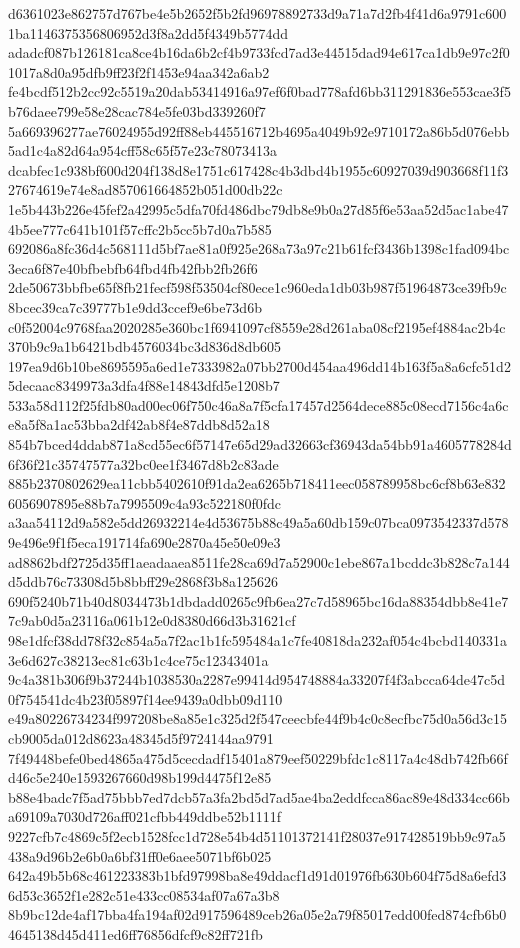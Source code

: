 \documentclass[11pt,a4paper]{article}
\begin{document}
{d6361023e862757d767be4e5b2652f5b2fd96978892733d9a71a7d2fb4f41d6a9791c6001ba1146375356806952d3f8a2dd5f4349b5774dd
adadcf087b126181ca8ce4b16da6b2cf4b9733fcd7ad3e44515dad94e617ca1db9e97c2f01017a8d0a95dfb9ff23f2f1453e94aa342a6ab2
fe4bcdf512b2cc92c5519a20dab53414916a97ef6f0bad778afd6bb311291836e553cae3f5b76daee799e58e28cac784e5fe03bd339260f7
5a669396277ae76024955d92ff88eb445516712b4695a4049b92e9710172a86b5d076ebb5ad1c4a82d64a954cff58c65f57e23c78073413a
dcabfec1c938bf600d204f138d8e1751c617428c4b3dbd4b1955c60927039d903668f11f327674619e74e8ad857061664852b051d00db22c
1e5b443b226e45fef2a42995c5dfa70fd486dbc79db8e9b0a27d85f6e53aa52d5ac1abe474b5ee777c641b101f57cffc2b5cc5b7d0a7b585
692086a8fc36d4c568111d5bf7ae81a0f925e268a73a97c21b61fcf3436b1398c1fad094bc3eca6f87e40bfbebfb64fbd4fb42fbb2fb26f6
2de50673bbfbe65f8fb21fecf598f53504cf80ece1c960eda1db03b987f51964873ce39fb9c8bcec39ca7c39777b1e9dd3ccef9e6be73d6b
c0f52004c9768faa2020285e360bc1f6941097cf8559e28d261aba08cf2195ef4884ac2b4c370b9c9a1b6421bdb4576034bc3d836d8db605
197ea9d6b10be8695595a6ed1e7333982a07bb2700d454aa496dd14b163f5a8a6cfc51d25decaac8349973a3dfa4f88e14843dfd5e1208b7
533a58d112f25fdb80ad00ec06f750c46a8a7f5cfa17457d2564dece885c08ecd7156c4a6ce8a5f8a1ac53bba2df42ab8f4e87ddb8d52a18
854b7bced4ddab871a8cd55ec6f57147e65d29ad32663cf36943da54bb91a4605778284d6f36f21c35747577a32bc0ee1f3467d8b2c83ade
885b2370802629ea11cbb5402610f91da2ea6265b718411eec058789958bc6cf8b63e8326056907895e88b7a7995509c4a93c522180f0fdc
a3aa54112d9a582e5dd26932214e4d53675b88c49a5a60db159c07bca0973542337d5789e496e9f1f5eca191714fa690e2870a45e50e09e3
ad8862bdf2725d35ff1aeadaaea8511fe28ca69d7a52900c1ebe867a1bcddc3b828c7a144d5ddb76c73308d5b8bbff29e2868f3b8a125626
690f5240b71b40d8034473b1dbdadd0265c9fb6ea27c7d58965bc16da88354dbb8e41e77c9ab0d5a23116a061b12e0d8380d66d3b31621cf
98e1dfcf38dd78f32c854a5a7f2ac1b1fc595484a1c7fe40818da232af054c4bcbd140331a3e6d627c38213ec81c63b1c4ce75c12343401a
9c4a381b306f9b37244b1038530a2287e99414d954748884a33207f4f3abcca64de47c5d0f754541dc4b23f05897f14ee9439a0dbb09d110
e49a80226734234f997208be8a85e1c325d2f547ceecbfe44f9b4c0c8ecfbc75d0a56d3c15cb9005da012d8623a48345d5f9724144aa9791
7f49448befe0bed4865a475d5cecdadf15401a879eef50229bfdc1c8117a4c48db742fb66fd46c5e240e1593267660d98b199d4475f12e85
b88e4badc7f5ad75bbb7ed7dcb57a3fa2bd5d7ad5ae4ba2eddfcca86ac89e48d334cc66ba69109a7030d726aff021cfbb449ddbe52b1111f
9227cfb7c4869c5f2ecb1528fcc1d728e54b4d51101372141f28037e917428519bb9c97a5438a9d96b2e6b0a6bf31ff0e6aee5071bf6b025
642a49b5b68c461223383b1bfd97998ba8e49ddacf1d91d01976fb630b604f75d8a6efd36d53c3652f1e282c51e433cc08534af07a67a3b8
8b9bc12de4af17bba4fa194af02d917596489ceb26a05e2a79f85017edd00fed874cfb6b04645138d45d411ed6ff76856dfcf9c82ff721fb
}
\end{document}
